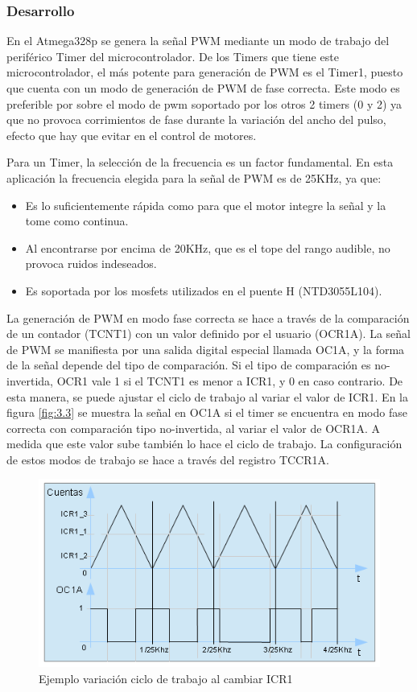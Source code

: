 \subsubsection{Desarrollo}
En el Atmega328p se genera la señal PWM mediante un modo de trabajo del periférico Timer del microcontrolador. De los Timers que tiene este microcontrolador, el más potente para generación de PWM es el Timer1, puesto que cuenta con un modo de generación de PWM de fase correcta. Este modo es preferible por sobre el modo de pwm soportado por los otros 2 timers (0 y 2) ya que no provoca corrimientos de fase durante la variación del ancho del pulso, efecto que hay que evitar en el control de motores.

Para un Timer, la selección de la frecuencia es un factor fundamental. En esta aplicación la frecuencia elegida para la señal de PWM es de 25KHz, ya que:
\begin{itemize}
	\item Es lo suficientemente rápida como para que el motor integre la señal y la tome como continua.
	\item Al encontrarse por encima de 20KHz, que es el tope del rango audible, no provoca ruidos indeseados.
	\item Es soportada por los mosfets utilizados en el puente H (NTD3055L104).
\end{itemize}

La generación de PWM en modo fase correcta se hace a través de la comparación de un contador (TCNT1) con un valor definido por el usuario (OCR1A). La señal de PWM se manifiesta por una salida digital especial llamada OC1A, y la forma de la señal depende del tipo de comparación. Si el tipo de comparación es no-invertida, OCR1 vale 1 si el TCNT1 es menor a ICR1, y 0 en caso contrario. De esta manera, se puede ajustar el ciclo de trabajo al variar el valor de ICR1. En la figura \ref{fig:3.3} se muestra la señal en OC1A si el timer se encuentra en modo fase correcta con comparación tipo no-invertida, al variar el valor de OCR1A. A medida que este valor sube también lo hace el ciclo de trabajo. La configuración de estos modos de trabajo se hace a través del registro TCCR1A.

\begin{figure}[!ht]
	\centering
	\includegraphics[width=15cm,scale=1]{resources/3_3-generacionPWM.png}
	\caption{Ejemplo variación ciclo de trabajo al cambiar ICR1}
	\label{fig:\thefigure}
\end{figure}

